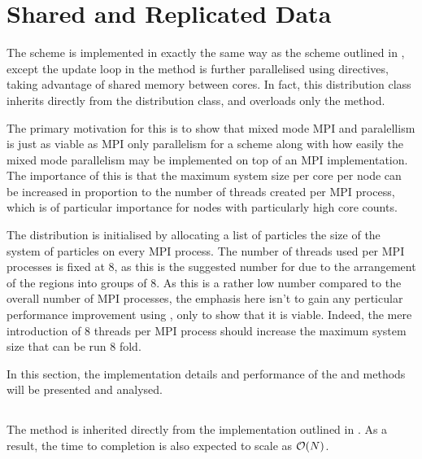\section{Shared and Replicated Data}

The \sharedandreplicateddata{} scheme is implemented in exactly the same
way as the \replicateddata{} scheme outlined in 
,
except the update loop in the \pairoperation{} method is further
parallelised using \openmp{} directives, taking advantage of shared
memory between cores.
%
In fact, this distribution class inherits directly from the
\replicateddata{} distribution class, and overloads only the
\pairoperation{} method.


The primary motivation for this is to show that mixed mode MPI and \openmp{}
paralellism is just as viable as MPI only parallelism for a \replicateddata{}
scheme along with how easily the mixed mode parallelism may be implemented
on top of an MPI implementation.
%
The importance of this is that the maximum system size per core per node
can be increased in proportion to the number of \openmp{} threads
created per MPI process, which is of particular importance for nodes with
particularly high core counts.

The \sharedandreplicateddata{} distribution is initialised by
allocating a list of particles the size of the system of particles
on every MPI process.
%
The number of \openmp{} threads used per MPI processes is fixed at 8,
as this is the suggested number for \hector{} due to the arrangement
of the \numa{} regions into groups of 8.
%
As this is a rather low number compared to the overall number of MPI
processes, the emphasis here isn't to gain any perticular performance
improvement using \openmp{}, only to show that it is viable.
%
Indeed, the mere introduction of 8 threads per MPI process should increase
the maximum system size that can be run 8 fold.

In this section,
the implementation details and performance of
the \individualoperation{} and \pairoperation{} methods
will be presented and analysed.


\subsection{\individualoperation{}}

The \individualoperation{} method is inherited directly from
the implementation outlined in
.
%
As a result, the time to completion is also expected to scale as $\mathcal{O}{\left({ N }\right)}$.

